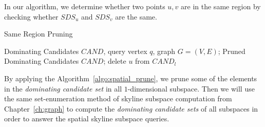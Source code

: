 In our algorithm, we determine whether two points $u, v$ are in the same region by checking whether $SDS_u$ and $SDS_v$ are the same.

\begin{algorithm}[H]
  \caption{Same Region Pruning}
  \label{algo:spatial_prune}
  \begin{algorithmic}[1]
  \show\LOOP
    \REQUIRE Dominating Candidates $CAND$, query vertex $q$, graph $G=(V, E)$;
    \ENSURE Pruned Dominating Candidates $CAND$;
                \STATE delete $u$ from $CAND_l$
            \ENDIF
        \ENDFOR
    \ENDFOR
  \end{algorithmic}
\end{algorithm}

By applying the Algorithm~\ref{algo:spatial_prune}, we prune some of the elements in the \emph{dominating candidate set} in all $1$-dimensional subspace. Then we will use the same set-enumeration method of skyline subspace computation from Chapter~\ref{ch:graph} to compute the \emph{dominating candidate sets} of all subspaces in order to answer the spatial skyline subspace queries.
